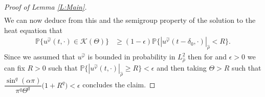\documentclass[a4paper,11pt]{article}%
\numberwithin{equation}{section}
\theoremstyle{plain}
\theoremstyle{definition}
\begin{document}
\begin{proof}[Proof of Lemma \ref{L:Main}]
\begin{align*}
	\end{align*}
	We can now deduce from this and the semigroup property of the solution to the heat equation that
	\begin{align*}
	\mathbb{P}\{ u^{\hat{\varphi}}(t,\cdot) \in \mathscr K(\Theta) \} & \ge (1-
	\epsilon)\mathbb{P}\{ |u^{\hat{\varphi}}(t-\delta_0,\cdot)|_{\widehat{\rho}} < R
	\}.
	\end{align*}
	Since we assumed that $u^{\hat \varphi}$ is bounded in probability in $L^2_{\widehat{\rho}}$ then for and $\epsilon >0$ we can fix $R>0$ such that $\mathbb{P}\{ |u^{\hat{\varphi}}(t,\cdot)|_{\widehat{\rho}} \ge R \} < \epsilon$ and then taking $\Theta > R$ such that $ \dfrac{\sin^q(\alpha \pi)}{\pi^q \Theta^q}\bigg( 1+ R^q \bigg) < \epsilon$ concludes the claim.
\end{proof}
\end{document}
